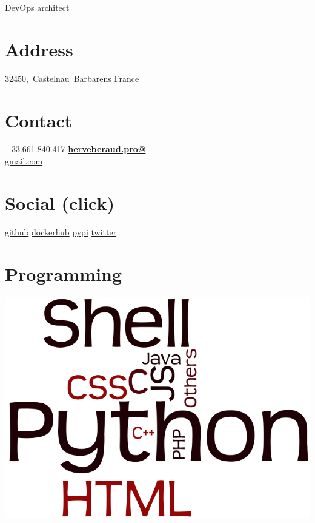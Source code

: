 \documentclass[]{friggeri-cv}
\begin{document}
{DevOps architect}


\begin{aside}
    \section{Address}
        32450,~Castelnau~Barbarens
        France
        ~
    \section{Contact}
        +33.661.840.417
        \href{mailto:herveberaud.pro@gmail.com}{\textbf{herveberaud.pro@}\\gmail.com}
        ~
    \section{Social (click)}
        \href{https://github.com/4383}{github}
        \href{https://hub.docker.com/r/4383}{dockerhub}
        \href{https://warehouse.python.org/user/4383/}{pypi}
        \href{https://twitter.com/4383hberaud}{twitter}
        ~
    \section{Programming}
        \includegraphics[scale=0.15]{img/programming.png}
        ~

\end{aside}
\end{document}
